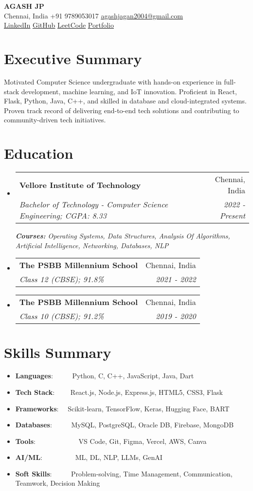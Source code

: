 \documentclass[a4paper,20pt]{article}
\makeatletter
\newcommand{\resumeItem}[2]{
  \item\small{
    \textbf{#1}{: #2 \vspace{-2pt}}
  }
}
\newcommand{\resumeSubheading}[4]{
  \vspace{-1pt}\item
    \begin{tabular*}{0.97\textwidth}{l@{\extracolsep{\fill}}r}
      \textbf{#1} & #2 \\
      \textit{#3} & \textit{#4} \\
    \end{tabular*}\vspace{-5pt}
}
\newcommand{\resumeSubItem}[2]{\resumeItem{#1}{#2}\vspace{-3pt}}
\newcommand{\resumeSubHeadingListStart}{\begin{itemize}[leftmargin=*]}
\newcommand{\resumeSubHeadingListEnd}{\end{itemize}}
\makeatother
\begin{document}
\begin{center}
  {\LARGE \textbf{AGASH JP}}\\

  Chennai, India \; \textbar{} \; +91 9789053017 \; \textbar{} \;
  \href{mailto:agashjagan2004@gmail.com}{\underline{agashjagan2004@gmail.com}} \\
  \href{https://www.linkedin.com/in/agash-jaganathan-451b1a256/}{\underline{LinkedIn}} \; \textbar{}
  \href{https://github.com/JusCookin}{\underline{GitHub}} \; \textbar{}
  \href{https://leetcode.com/agash}{\underline{LeetCode}} \; \textbar{}
  \href{https://portfolio-ashy-eight-70.vercel.app/}{\underline{Portfolio}}
\end{center}

\section{Executive Summary}
Motivated Computer Science undergraduate with hands-on experience in full-stack development, machine learning, and IoT innovation. Proficient in React, Flask, Python, Java, C++, and skilled in database and cloud-integrated systems. Proven track record of delivering end-to-end tech solutions and contributing to community-driven tech initiatives.
\vspace{-2pt}

\section{Education}
  \resumeSubHeadingListStart
    \resumeSubheading
      {Vellore Institute of Technology}{Chennai, India}
      {Bachelor of Technology - Computer Science Engineering;  CGPA: 8.33}{2022 - Present}
      {\scriptsize \textit{ \footnotesize{\newline{}\textbf{Courses:} Operating Systems, Data Structures, Analysis Of Algorithms, Artificial Intelligence, Networking, Databases, NLP}}}
      \resumeSubheading
      {The PSBB Millennium School}{Chennai, India}
      {Class 12 (CBSE); 91.8\%}{2021 - 2022}
      \resumeSubheading
      {The PSBB Millennium School}{Chennai, India}
      {Class 10 (CBSE); 91.2\%}{2019 - 2020}
  \resumeSubHeadingListEnd	    
\vspace{-2pt}

\section{Skills Summary}
\resumeSubHeadingListStart
  \resumeSubItem{Languages}{~~~~~Python, C, C++, JavaScript, Java, Dart}
  \resumeSubItem{Tech Stack}{~~~~React.js, Node.js, Express.js, HTML5, CSS3, Flask}
  \resumeSubItem{Frameworks}{~~Scikit-learn, TensorFlow, Keras, Hugging Face, BART}
  \resumeSubItem{Databases}{~~~~~MySQL, PostgreSQL, Oracle DB, Firebase, MongoDB}
  \resumeSubItem{Tools}{~~~~~~~~~~~~VS Code, Git, Figma, Vercel, AWS, Canva}
  \resumeSubItem{AI/ML}{~~~~~~~~~ML, DL, NLP, LLMs, GenAI}
  \resumeSubItem{Soft Skills}{~~~~~Problem-solving, Time Management, Communication, Teamwork, Decision Making}
\resumeSubHeadingListEnd
\end{document}
